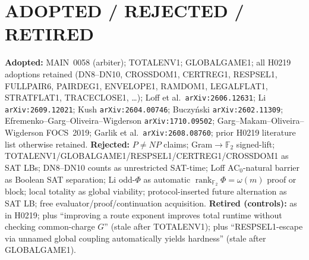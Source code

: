\documentclass[11pt]{article}
\begin{document}
\section*{ADOPTED / REJECTED / RETIRED}
\textbf{Adopted:} MAIN~0058 (arbiter); TOTALENV1; GLOBALGAME1; all H0219
adoptions retained (DN8--DN10, CROSSDOM1, CERTREG1, RESPSEL1, FULLPAIR6,
PAIRDEG1, ENVELOPE1, RAMDOM1, LEGALFLAT1, STRATFLAT1, TRACECLOSE1, \ldots);
Loff et al.\ \texttt{arXiv:2606.12631}; Li \texttt{arXiv:2609.12021};
Kush \texttt{arXiv:2604.00746}; Buczy\'nski \texttt{arXiv:2602.11309};
Efremenko--Garg--Oliveira--Wigderson \texttt{arXiv:1710.09502};
Garg--Makam--Oliveira--Wigderson FOCS~2019; Garlik et al.\ \texttt{arXiv:2608.08760};
prior H0219 literature list otherwise retained.
\textbf{Rejected:} $P\neq NP$ claims; Gram$\to\mathbb F_2$ signed-lift;
TOTALENV1/GLOBALGAME1/RESPSEL1/CERTREG1/CROSSDOM1 as SAT LBs;
DN8--DN10 counts as unrestricted SAT-time; Loff AC$_0$-natural barrier as
Boolean SAT separation; Li odd-$\Phi$ as automatic
$\operatorname{rank}_{\mathbb F_2}\Phi=\omega(m)$ proof or block;
local totality as global viability; protocol-inserted future alternation as
SAT LB; free evaluator/proof/continuation acquisition.
\textbf{Retired (controls):} as in H0219; plus ``improving a route exponent
improves total runtime without checking common-charge $G$'' (stale after
TOTALENV1); plus ``RESPSEL1-escape via unnamed global coupling automatically
yields hardness'' (stale after GLOBALGAME1).
\end{document}
